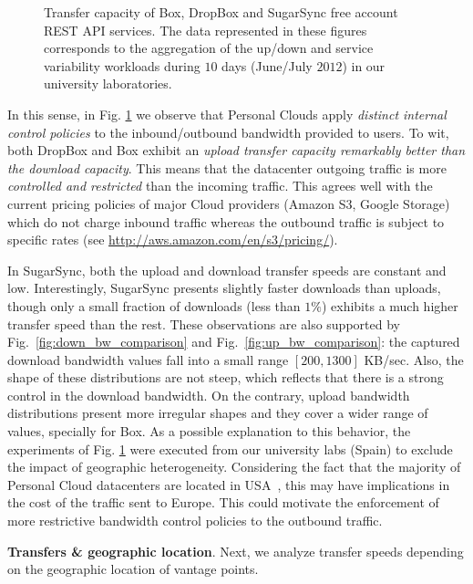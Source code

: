 \begin{figure}[t]
   \caption{Transfer capacity of Box, DropBox and SugarSync free account REST API services.
   The data represented in these figures corresponds to the aggregation
   of the up/down and service variability workloads during $10$ days (June/July $2012$) in our university laboratories.}
   \label{fig:transfer_mean_speeds_and_bw_distributions}
   \vspace{-4mm}
\end{figure}

In this sense, in Fig. \ref{fig:transfer_mean_speeds_and_bw_distributions} we observe  
that Personal Clouds apply \textit{distinct internal control policies}
to the inbound/outbound bandwidth provided to users. To wit,
both DropBox and Box exhibit an \textit{upload transfer capacity remarkably better
than the download capacity}. This means that the datacenter outgoing
traffic is more \textit{controlled and restricted} than the incoming traffic. This agrees
well with the current pricing policies of major Cloud providers (Amazon S3,
Google Storage) which do not charge inbound traffic whereas
the outbound traffic is subject to specific rates (see \url{http://aws.amazon.com/en/s3/pricing/}). 

In SugarSync, both the upload and download transfer speeds are constant and
low. Interestingly, SugarSync presents slightly faster downloads than uploads,
though only a small fraction of downloads (less than $1\%$) exhibits a much
higher transfer speed than the rest. These observations are also supported by Fig.~\ref{fig:down_bw_comparison} and Fig.~\ref{fig:up_bw_comparison}: the captured download
bandwidth values fall into a small range $[200, 1300]$ KB/sec. Also,
the shape of these distributions are not steep, which reflects that there is
a strong control in the download bandwidth.
On the contrary, upload bandwidth distributions present more irregular shapes and
they cover a wider range of values, specially for Box.
As a possible explanation to this behavior, the experiments of Fig. \ref{fig:transfer_mean_speeds_and_bw_distributions} 
were executed from our university labs (Spain) to exclude the impact of geographic heterogeneity. 
Considering the fact that the majority of 
Personal Cloud datacenters are located in USA~\cite{drago2013benchmarking}, 
this may have implications in the cost of the traffic sent to Europe. This could motivate
the enforcement of more restrictive bandwidth control policies to
the outbound traffic.
\medskip

\noindent\textbf{Transfers \& geographic location}. 
Next, we analyze transfer speeds depending
on the geographic location of vantage points. 

